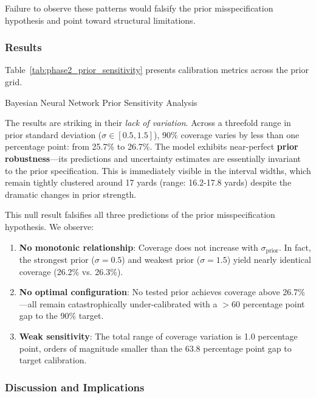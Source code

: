 Failure to observe these patterns would falsify the prior misspecification hypothesis and point toward structural limitations.

\subsubsection{Results}

Table~\ref{tab:phase2_prior_sensitivity} presents calibration metrics across the prior grid.

\begin{table}[t]
\centering
\caption{Bayesian Neural Network Prior Sensitivity Analysis}
\label{tab:phase2_prior_sensitivity}

\end{table}

The results are striking in their \textit{lack of variation}. Across a threefold range in prior standard deviation ($\sigma \in [0.5, 1.5]$), 90\% coverage varies by less than one percentage point: from 25.7\% to 26.7\%. The model exhibits near-perfect \textbf{prior robustness}—its predictions and uncertainty estimates are essentially invariant to the prior specification. This is immediately visible in the interval widths, which remain tightly clustered around 17 yards (range: 16.2-17.8 yards) despite the dramatic changes in prior strength.

This null result falsifies all three predictions of the prior misspecification hypothesis. We observe:

\begin{enumerate}
    \item \textbf{No monotonic relationship}: Coverage does not increase with $\sigma_{\text{prior}}$. In fact, the strongest prior ($\sigma = 0.5$) and weakest prior ($\sigma = 1.5$) yield nearly identical coverage (26.2\% vs. 26.3\%).

    \item \textbf{No optimal configuration}: No tested prior achieves coverage above 26.7\%—all remain catastrophically under-calibrated with a $>60$ percentage point gap to the 90\% target.

    \item \textbf{Weak sensitivity}: The total range of coverage variation is 1.0 percentage point, orders of magnitude smaller than the 63.8 percentage point gap to target calibration.
\end{enumerate}

\subsubsection{Discussion and Implications}

